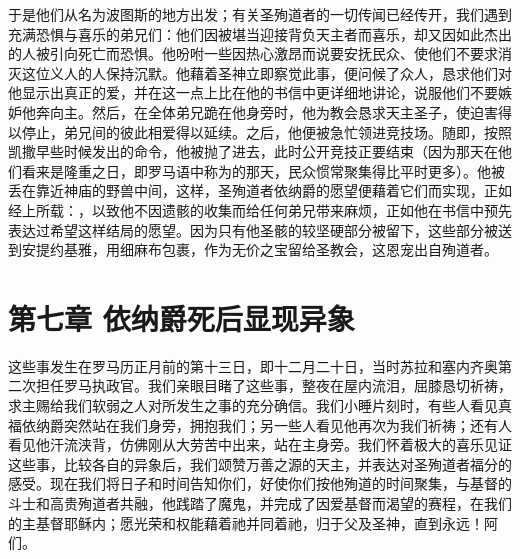 于是他们从名为波图斯的地方出发；有关圣殉道者的一切传闻已经传开，我们遇到充满恐惧与喜乐的弟兄们：他们因被堪当迎接背负天主者而喜乐，却又因如此杰出的人被引向死亡而恐惧。他吩咐一些因热心激昂而说要安抚民众、使他们不要求消灭这位义人的人保持沉默。他藉着圣神立即察觉此事，便问候了众人，恳求他们对他显示出真正的爱，并在这一点上比在他的书信中更详细地讲论，说服他们不要嫉妒他奔向主。然后，在全体弟兄跪在他身旁时，他为教会恳求天主圣子，使迫害得以停止，弟兄间的彼此相爱得以延续。之后，他便被急忙领进竞技场。随即，按照凯撒早些时候发出的命令，他被抛了进去，此时公开竞技正要结束（因为那天在他们看来是隆重之日，即罗马语中称为的那天，民众惯常聚集得比平时更多）。他被丢在靠近神庙的野兽中间，这样，圣殉道者依纳爵的愿望便藉着它们而实现，正如经上所载：，以致他不因遗骸的收集而给任何弟兄带来麻烦，正如他在书信中预先表达过希望这样结局的愿望。因为只有他圣骸的较坚硬部分被留下，这些部分被送到安提约基雅，用细麻布包裹，作为无价之宝留给圣教会，这恩宠出自殉道者。\par


\section{第七章 依纳爵死后显现异象}

这些事发生在罗马历正月前的第十三日，即十二月二十日，当时苏拉和塞内齐奥第二次担任罗马执政官。我们亲眼目睹了这些事，整夜在屋内流泪，屈膝恳切祈祷，求主赐给我们软弱之人对所发生之事的充分确信。我们小睡片刻时，有些人看见真福依纳爵突然站在我们身旁，拥抱我们；另一些人看见他再次为我们祈祷；还有人看见他汗流浃背，仿佛刚从大劳苦中出来，站在主身旁。我们怀着极大的喜乐见证这些事，比较各自的异象后，我们颂赞万善之源的天主，并表达对圣殉道者福分的感受。现在我们将日子和时间告知你们，好使你们按他殉道的时间聚集，与基督的斗士和高贵殉道者共融，他践踏了魔鬼，并完成了因爱基督而渴望的赛程，在我们的主基督耶稣内；愿光荣和权能藉着祂并同着祂，归于父及圣神，直到永远！阿们。\par

